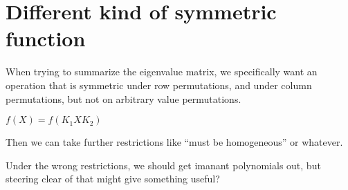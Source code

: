 \documentclass[10pt,a4paper]{report}
\begin{document}
\section{Different kind of symmetric function}

When trying to summarize the eigenvalue matrix, we specifically want an
operation that is symmetric under row permutations, and under column
permutations, but not on arbitrary value permutations.

$f(X) = f(K_1XK_2)$

Then we can take further restrictions like ``must be homogeneous'' or whatever.

Under the wrong restrictions, we should get imanant polynomials out, but
steering clear of that might give something useful?
\end{document}
